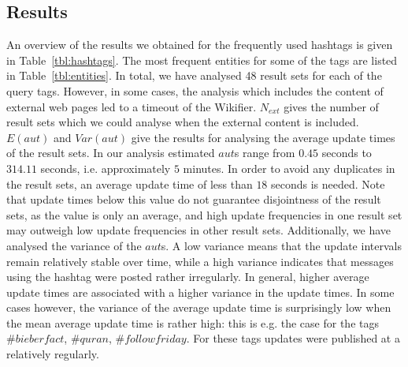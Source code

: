 \documentclass{llncs}
\begin{document}
\subsection{Results}

An overview of the results we obtained for the frequently used hashtags is given in Table~\ref{tbl:hashtags}. The most frequent entities for some of the tags are listed in Table~\ref{tbl:entities}. In total, we have analysed 48 result sets for each of the query tags. However, in some cases, the analysis which includes the content of external web pages led to a timeout of the Wikifier. $N_{ext}$ gives the number of result sets which we could analyse when the external content is included. $E(aut)$ and $Var(aut)$ give the results for analysing the average update times of the result sets. In our analysis estimated $aut$s range from $0.45$ seconds to $314.11$ seconds, i.e. approximately $5$ minutes. In order to avoid any duplicates in the result sets, an average update time of less than $18$ seconds is needed. Note that update times below this value do not guarantee disjointness of the result sets, as the value is only an average, and high update frequencies in one result set may outweigh low update frequencies in other result sets. Additionally, we have analysed the variance of the $aut$s. A low variance means that the update intervals remain relatively stable over time, while a high variance indicates that messages using the hashtag were posted rather irregularly. In general, higher average update times are associated with a higher variance in the update times. In some cases however, the variance of the average update time is surprisingly low when the mean average update time is rather high: this is e.g. the case for the tags $\#bieberfact$, $\#quran$, $\#followfriday$. For these tags updates were published at a relatively regularly.
\end{document}
